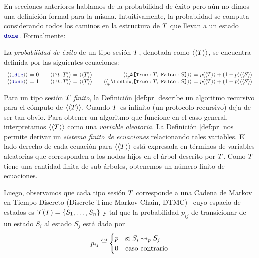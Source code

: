 En secciones anteriores hablamos de la probabilidad de éxito pero aún no dimos
una definición formal para la misma. Intuitivamente, la probablidad se computa
considerando todos los caminos en la estructura de $T$ que llevan a
un estado $\Done$. Formalmente:

\begin{definition}
  \label{def:pr}
	La \emph{probabilidad de éxito} de un tipo sesión $T$,
	denotada como $\langle\langle T\rangle\rangle$, se encuentra definida por
	las siguientes ecuaciones:
  \[
    \begin{array}{r@{~}c@{~}l}
      \psfun\Idle & = & 0 \\
      \psfun\Done & = & 1 \\
    \end{array}
    \quad
    \begin{array}{r@{~}c@{~}l}
      \psfun{\In\Type\SessionType} & = & \psfun\SessionType \\
      \psfun{\Out\Type\SessionType} & = & \psfun\SessionType \\
    \end{array}
    \quad
    \begin{array}{r@{~}c@{~}l}
      \psfun{\BinaryPBranch\SessionTypeT\SessionTypeS} & = & p\psfun\SessionTypeT + (1-p)\psfun\SessionTypeS \\
      \psfun{\BinaryPChoice\SessionTypeT\SessionTypeS} & = & p\psfun\SessionTypeT + (1-p)\psfun\SessionTypeS \\
    \end{array}
  \]
\end{definition}

Para un tipo sesión $T$ \emph{finito}, la Definición \ref{def:pr}
describe un algoritmo recursivo para el cómputo de $\langle\langle T\rangle\rangle$. Cuando
$T$ es infinito (un protocolo recursivo) deja de ser tan obvio. Para
obtener un algoritmo que funcione en el caso general, interpretamos
$\langle\langle T\rangle\rangle$ como una \emph{variable aleatoria}. La Definición
\ref{def:pr} nos permite derivar un \emph{sistema finito de ecuaciones}
relacionando tales variables. El lado derecho de cada ecuación para
$\langle\langle T\rangle\rangle$ está expresada en términos de variables aleatorias que
corresponden a los nodos hijos en el árbol descrito por $T$. Como
$T$ tiene una cantidad finita de sub-árboles, obtenemos un número
finito de ecuaciones.

Luego, observamos que cada tipo sesión $T$ corresponde a una Cadena
de Markov en Tiempo Discreto (Discrete-Time Markov Chain, DTMC)~ cuyo espacio de estados es $\trees\SessionType = \mathset{S_1,
\dots, S_n}$ y tal que la probabilidad $p_{ij}$ de transicionar de un estado
$S_i$ al estado $S_j$ está dada por
\[
  p_{ij} \eqdef
  \begin{cases}
    p & \text{si $S_i \tred[p] S_j$}
    \\
    0 & \text{caso contrario}
  \end{cases}
\]
\label{pg:regreach}

